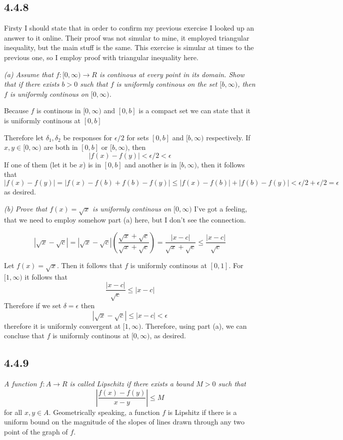 \documentclass[11pt,oneside,titlepage]{book}
\begin{document}
\subsection*{4.4.8}
Firsty I should state that in order to confirm my previous exercise I looked
up an answer to it online. Their proof was not simular to mine, it employed
triangular inequality, but the main stuff is the same. This exercise is
simular at times to the previous one, so I employ proof with triangular
inequality here.

\textit{(a) Assume that $f: [0, \infty) \to R$ is continous at every point in
  its domain. Show that if there exists $b > 0$ such that $f$ is uniformly
  continous on the set $[b, \infty)$, then $f$ is uniformly continous on
  $[0, \infty)$.}

Because $f$ is continous in $[0, \infty)$ and $[0, b]$ is a
compact set we can state that
it is uniformly continous at $[0, b]$

Therefore let $\delta_1, \delta_2$ be responses for $\epsilon / 2$ for
sets $[0, b]$ and $[b, \infty)$ respectively. If $x, y \in [0, \infty)$ are
both in $[0, b]$ or $[b, \infty)$, then
$$|f(x) - f(y)| < \epsilon / 2 < \epsilon$$
If one of them (let it be $x$) is in $[0, b]$ and another is in $[b, \infty)$,
then it follows that
$$|f(x) - f(y)| = |f(x) - f(b) + f(b) - f(y)| \leq
|f(x) - f(b)| + |f(b) - f(y)| < \epsilon/2 + \epsilon/2 = \epsilon$$
as desired.

\textit{(b) Prove that $f(x) = \sqrt{x}$ is uniformly continous on
  $[0, \infty)$}
I've got a feeling, that we need to employ somehow part (a) here, but I don't
see the connection.

$$|\sqrt{x} - \sqrt{c}| =
|\sqrt{x} - \sqrt{c}|\left(\frac{\sqrt{x} + \sqrt{c}}{\sqrt{x} +
    \sqrt{c}}\right) = 
\frac{|x - c|}{\sqrt{x} + \sqrt{c}} \leq  \frac{|x - c|}{\sqrt{c}}  $$

Let $f(x) = \sqrt{x}$. Then it follows that $f$ is uniformly continous at
$[0, 1]$. For $[1, \infty)$ it follows that
$$\frac{|x - c|}{\sqrt{c}} \leq |x - c|$$
Therefore if we set $\delta = \epsilon$ then
$$|\sqrt{x} - \sqrt{c}| \leq |x - c| < \epsilon$$
therefore it is uniformly convergent at $[1, \infty)$.
Therefore, using part (a), we can concluse that $f$ is uniformly continous at
$[0, \infty)$, as desired.

\subsection*{4.4.9}
\textit{A function $f: A \to R$ is called Lipschitz if there exists a bound
  $M > 0$ such that }
$$\left|\frac{f(x) - f(y)}{x - y}\right| \leq M$$
for all $x, y \in A$. Geometrically speaking, a function $f$ is Lipshitz if
there is a uniform  bound on the magnitude of the slopes of lines drawn
through any two point of the graph of $f$.
\end{document}
